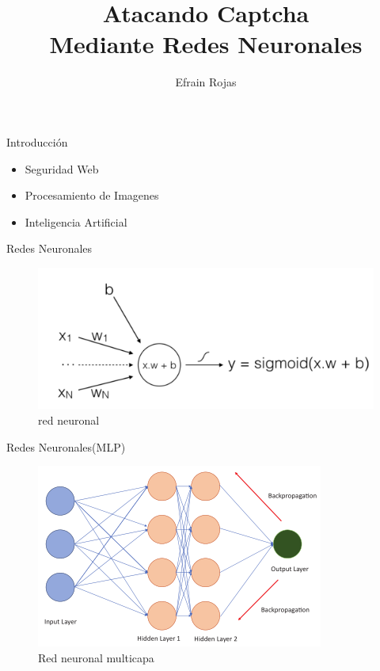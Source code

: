\documentclass[12pt]{beamer}
\author{Efrain Rojas}
\title{Atacando Captcha\\ Mediante Redes Neuronales}
\institute{I.I.I-UMSA}
\begin{document}
\begin{frame}
\titlepage
\end{frame}


\begin{frame}{Introducci\'on}
\begin{itemize}[<+->]
\item Seguridad Web
\item Procesamiento de Imagenes
\item Inteligencia Artificial
\end{itemize}
\end{frame}


\begin{frame}{Redes Neuronales}

\begin{figure}[H]
\centering
\includegraphics[scale=0.5]{2021-03-23_195019.png}
\caption{red neuronal}
\end{figure}

\end{frame}

\begin{frame}{Redes Neuronales(MLP)}

\begin{figure}[H]
\centering
\includegraphics[scale=0.6]{2021-03-23_200337.png} 
\caption{Red neuronal multicapa}
\end{figure}

\end{frame}
\end{document}

